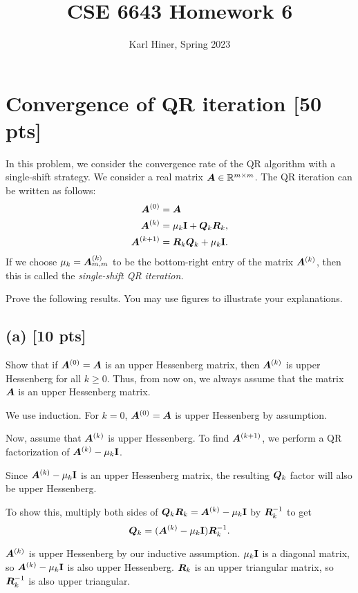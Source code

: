 \documentclass[twoside,10pt]{article}
\begin{document}
\title{CSE 6643 Homework 6}
\author{Karl Hiner, Spring 2023}
\date{}
\maketitle

\section{Convergence of QR iteration [50 pts]}
  In this problem, we consider the convergence rate of the QR algorithm with a single-shift strategy. We consider a real matrix $\bm{A} \in \mathbb{R}^{m \times m}$. 
  The QR iteration can be written as follows:
  \begin{align}
    \bm{A}^{(0)} &= \bm{A} \\
    \bm{A}^{(k)} &= \mu_k \mathbf{I} + \bm{Q}_k \bm{R}_k,\\
    \bm{A}^{(k+1)} &= \bm{R}_k \bm{Q}_k + \mu_k \mathbf{I}.
  \end{align}
  If we choose $\mu_k = \bm{A}_{m, m}^{(k)}$ to be the bottom-right entry of the matrix $\bm{A}^{(k)}$, then this is called the \emph{single-shift QR iteration.}

  Prove the following results.
  You may use figures to illustrate your explanations. 
  \subsection*{(a) [10 pts]}
  Show that if $\bm{A}^{(0)} = \bm{A}$ is an upper Hessenberg matrix, then $\bm{A}^{(k)}$ is upper Hessenberg for all $k \geq 0$.
  Thus, from now on, we always assume that the matrix $\bm{A}$ is an upper Hessenberg matrix.

    \quad We use induction. For $k = 0$, $\bm{A}^{(0)} = \bm{A}$ is upper Hessenberg by assumption.
    
    Now, assume that $\bm{A}^{(k)}$ is upper Hessenberg.
    To find $\bm{A}^{(k+1)}$, we perform a QR factorization of $\bm{A}^{(k)} - \mu_k \mathbf{I} $.
    
    Since $\bm{A}^{(k)} - \mu_k \mathbf{I}$ is an upper Hessenberg matrix, the resulting $\bm{Q}_k$ factor will also be upper Hessenberg.

    To show this, multiply both sides of $\bm{Q}_k \bm{R}_k = \bm{A}^{(k)} - \mu_k \mathbf{I}$ by $\bm{R}_k^{-1}$ to get
    $$\bm{Q}_k = (\bm{A}^{(k)} - \mu_k \mathbf{I}) \bm{R}_k^{-1}.$$
    
    $\bm{A}^{(k)}$ is upper Hessenberg by our inductive assumption.
    $\mu_k \mathbf{I}$ is a diagonal matrix, so $\bm{A}^{(k)} - \mu_k \mathbf{I}$ is also upper Hessenberg.
    $\bm{R}_k$ is an upper triangular matrix, so $\bm{R}_k^{-1}$ is also upper triangular.
  
\end{document}
